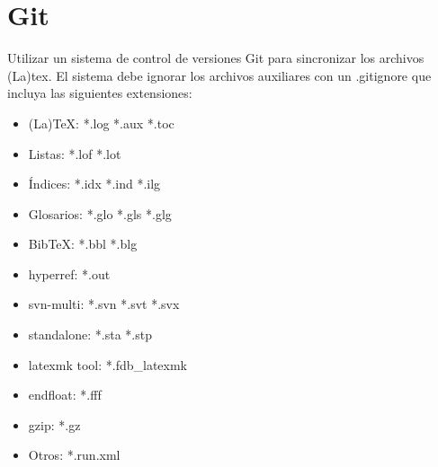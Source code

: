 \documentclass[12pt, a4paper]{article}
\begin{document}
\section{Git}

Utilizar un sistema de control de versiones Git para sincronizar los archivos (La)tex. El sistema debe ignorar los archivos auxiliares con un .gitignore que incluya las siguientes extensiones:

\begin{itemize}
\item (La)TeX: *.log *.aux *.toc
\item Listas: *.lof *.lot
\item Índices: *.idx *.ind *.ilg
\item Glosarios: *.glo *.gls *.glg
\item BibTeX: *.bbl *.blg
\item hyperref: *.out
\item svn-multi: *.svn *.svt *.svx
\item standalone: *.sta *.stp
\item latexmk tool: *.fdb\_latexmk
\item endfloat: *.fff
\item gzip: *.gz
\item Otros: *.run.xml
\end{itemize}
\end{document}

